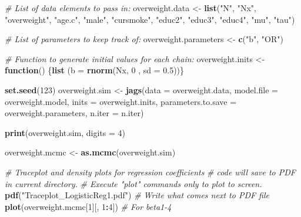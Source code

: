 \documentclass[
  11pt,
]{article}
\newenvironment{Shaded}{\begin{snugshade}}{\end{snugshade}}
\newcommand{\CommentTok}[1]{\textcolor[rgb]{0.56,0.35,0.01}{\textit{#1}}}
\newcommand{\ControlFlowTok}[1]{\textcolor[rgb]{0.13,0.29,0.53}{\textbf{#1}}}
\newcommand{\DataTypeTok}[1]{\textcolor[rgb]{0.13,0.29,0.53}{#1}}
\newcommand{\DecValTok}[1]{\textcolor[rgb]{0.00,0.00,0.81}{#1}}
\newcommand{\FloatTok}[1]{\textcolor[rgb]{0.00,0.00,0.81}{#1}}
\newcommand{\KeywordTok}[1]{\textcolor[rgb]{0.13,0.29,0.53}{\textbf{#1}}}
\newcommand{\NormalTok}[1]{#1}
\newcommand{\OperatorTok}[1]{\textcolor[rgb]{0.81,0.36,0.00}{\textbf{#1}}}
\newcommand{\StringTok}[1]{\textcolor[rgb]{0.31,0.60,0.02}{#1}}
\begin{document}
\begin{Shaded}
\begin{Highlighting}[]
\CommentTok{# List of data elements to pass in:}
\NormalTok{overweight.data <-}\StringTok{ }\KeywordTok{list}\NormalTok{(}\StringTok{"N"}\NormalTok{, }
                        \StringTok{"Nx"}\NormalTok{, }
                        \StringTok{"overweight"}\NormalTok{, }
                        \StringTok{"age.c"}\NormalTok{, }
                        \StringTok{"male"}\NormalTok{, }
                        \StringTok{"cursmoke"}\NormalTok{,}
                        \StringTok{"educ2"}\NormalTok{, }
                        \StringTok{"educ3"}\NormalTok{,}
                        \StringTok{"educ4"}\NormalTok{,}
                        \StringTok{"mu"}\NormalTok{,}
                        \StringTok{"tau"}\NormalTok{)}

\CommentTok{# List of parameters to keep track of:}
\NormalTok{overweight.parameters <-}\StringTok{ }\KeywordTok{c}\NormalTok{(}\StringTok{"b"}\NormalTok{, }\StringTok{"OR"}\NormalTok{)}

\CommentTok{# Function to generate initial values for each chain:}
\NormalTok{overweight.inits <-}\StringTok{ }\ControlFlowTok{function}\NormalTok{() \{}\KeywordTok{list}\NormalTok{ (}\DataTypeTok{b =} \KeywordTok{rnorm}\NormalTok{(Nx, }\DecValTok{0}\NormalTok{ , }\DataTypeTok{sd =} \FloatTok{0.5}\NormalTok{))\}}


\KeywordTok{set.seed}\NormalTok{(}\DecValTok{123}\NormalTok{)}
\NormalTok{overweight.sim <-}\StringTok{ }\KeywordTok{jags}\NormalTok{(}\DataTypeTok{data =}\NormalTok{ overweight.data,}
                       \DataTypeTok{model.file =}\NormalTok{ overweight.model,}
                       \DataTypeTok{inits =}\NormalTok{ overweight.inits,}
                       \DataTypeTok{parameters.to.save =}\NormalTok{ overweight.parameters,}
                       \DataTypeTok{n.iter =}\NormalTok{ n.iter)}

\KeywordTok{print}\NormalTok{(overweight.sim, }\DataTypeTok{digits =} \DecValTok{4}\NormalTok{)}


\NormalTok{overweight.mcmc <-}\StringTok{ }\KeywordTok{as.mcmc}\NormalTok{(overweight.sim)}

\CommentTok{# Traceplot and density plots for regression coefficients}
\CommentTok{# code will save to PDF in current directory.}
\CommentTok{# Execute "plot" commands only to plot to screen.}
\KeywordTok{pdf}\NormalTok{(}\StringTok{"Traceplot_LogisticReg1.pdf"}\NormalTok{) }\CommentTok{# Write what comes next to PDF file}
\KeywordTok{plot}\NormalTok{(overweight.mcmc[}\DecValTok{1}\NormalTok{][, }\DecValTok{1}\OperatorTok{:}\DecValTok{4}\NormalTok{]) }\CommentTok{# For beta1-4}


\end{Highlighting}
\end{Shaded}
\end{document}
